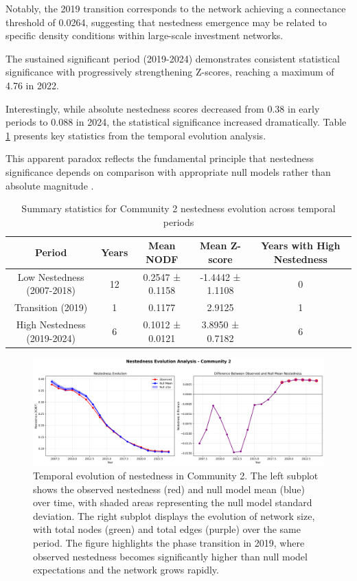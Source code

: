 Notably, the 2019 transition corresponds to the network achieving a connectance threshold of 0.0264, suggesting that nestedness emergence may be related to specific density conditions within large-scale investment networks.

The sustained significant period (2019-2024) demonstrates consistent statistical significance with progressively strengthening Z-scores, reaching a maximum of 4.76 in 2022. 

Interestingly, while absolute nestedness scores decreased from 0.38 in early periods to 0.088 in 2024, the statistical significance increased dramatically. Table \ref{tab:nestedness_evolution_summary} presents key statistics from the temporal evolution analysis.

This apparent paradox reflects the fundamental principle that nestedness significance depends on comparison with appropriate null models rather than absolute magnitude \cite{Mariani2019}.

\begin{table}[htbp]
\hspace*{-1cm}\centering
\begin{tabular}{|c|c|c|c|c|}
\hline
\textbf{Period} & \textbf{Years} & \textbf{Mean NODF} & \textbf{Mean Z-score} & \textbf{Years with High Nestedness} \\
\hline
Low Nestedness (2007-2018) & 12 & 0.2547 ± 0.1158 & -1.4442 ± 1.1108 & 0 \\
Transition (2019) & 1 & 0.1177 & 2.9125 & 1 \\
High Nestedness (2019-2024) & 6 & 0.1012 ± 0.0121 & 3.8950 ± 0.7182 & 6 \\
\hline
\end{tabular}
\caption{Summary statistics for Community 2 nestedness evolution across temporal periods}
\label{tab:nestedness_evolution_summary}
\end{table}

\begin{figure}[htbp]
\hspace*{-1cm}\centering
\includegraphics[width=1.2\textwidth]{../figures/us/nestedness_evolution_community_2_pt1.png}
\caption{Temporal evolution of nestedness in Community 2. The left subplot shows the observed nestedness (red) and null model mean (blue) over time, with shaded areas representing the null model standard deviation. The right subplot displays the evolution of network size, with total nodes (green) and total edges (purple) over the same period. The figure highlights the phase transition in 2019, where observed nestedness becomes significantly higher than null model expectations and the network grows rapidly.}
\label{fig:observed_vs_null_model}
\end{figure}

